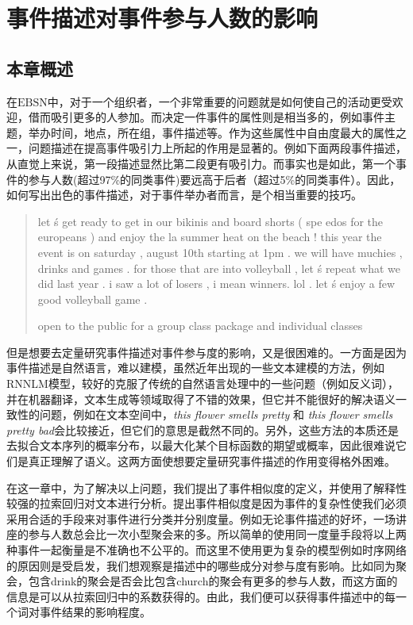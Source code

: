 % 
\section{事件描述对事件参与人数的影响} 
\subsection{本章概述} 
在$\mathrm{EBSN}$中，对于一个组织者，一个非常重要的问题就是如何使自己的活动更受欢迎，借而吸引更多的人参加。而决定一件事件的属性则是相当多的，例如事件主题，举办时间，地点，所在组，事件描述等。作为这些属性中自由度最大的属性之一，问题描述在提高事件吸引力上所起的作用是显著的。例如下面两段事件描述，从直觉上来说，第一段描述显然比第二段更有吸引力。而事实也是如此，第一个事件的参与人数(超过97\%的同类事件)要远高于后者（超过5\%的同类事件）。因此，如何写出出色的事件描述，对于事件举办者而言，是个相当重要的技巧。
 
\begin{quotation}
  let  \' s get ready to get in our bikinis and board shorts  (  spe
  edos for the europeans  )  and enjoy the la summer heat on the beach
  !  this year the event is on saturday  ,  august 10th starting at 
  1pm . we will have muchies  ,  drinks and games . for those that 
  are into volleyball  ,  let  \' s repeat what we did last year . 
  i saw a lot of losers  ,  i mean winners. lol . let  \' s enjoy 
  a few good volleyball game .
    
  open to the public for a group class package and individual classes
\end{quotation}

但是想要去定量研究事件描述对事件参与度的影响，又是很困难的。一方面是因为事件描述是自然语言，难以建模，虽然近年出现的一些文本建模的方法，例如RNNLM模型，较好的克服了传统的自然语言处理中的一些问题（例如反义词），并在机器翻译，文本生成等领域取得了不错的效果，但它并不能很好的解决语义一致性的问题，例如在文本空间中，\textit{this flower smells pretty} 和 \textit{this flower smells pretty bad}会比较接近，但它们的意思是截然不同的。另外，这些方法的本质还是去拟合文本序列的概率分布，以最大化某个目标函数的期望或概率，因此很难说它们是真正理解了语义。这两方面使想要定量研究事件描述的作用变得格外困难。

在这一章中，为了解决以上问题，我们提出了事件相似度的定义，并使用了解释性较强的拉索回归对文本进行分析。提出事件相似度是因为事件的复杂性使我们必须采用合适的手段来对事件进行分类并分别度量。例如无论事件描述的好坏，一场讲座的参与人数总会比一次小型聚会来的多。所以简单的使用同一度量手段将以上两种事件一起衡量是不准确也不公平的。而这里不使用更为复杂的模型例如时序网络的原因则是受\citep{noauthor_predicting_nodate}启发，我们想观察是描述中的哪些成分对参与度有影响。比如同为聚会，包含drink的聚会是否会比包含church的聚会有更多的参与人数，而这方面的信息是可以从拉索回归中的系数获得的。由此，我们便可以获得事件描述中的每一个词对事件结果的影响程度。

